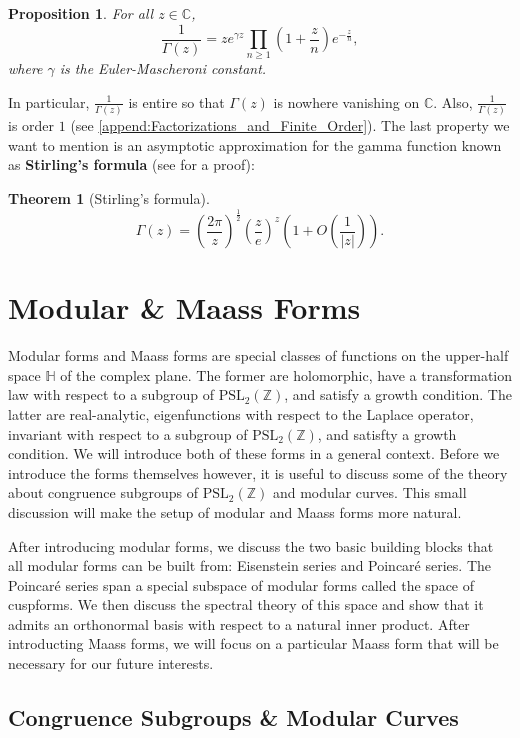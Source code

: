 \documentclass[12pt]{book}
\newtheorem{theorem}{Theorem}[section]
\newtheorem{proposition}{Proposition}[section]
\theoremstyle{definition}\newframedtheorem{method}{Method}
\newcommand{\PSL}{\mathrm{PSL}}
\newcommand{\Z}{\mathbb{Z}}
\newcommand{\C}{\mathbb{C}}
\renewcommand{\H}{\mathbb{H}}
\newcommand{\g}{\gamma}
\newcommand{\G}{\Gamma}
\newcommand{\<}{\langle}
\renewcommand{\>}{\rangle}
\begin{document}
    \begin{proposition}
      For all $z \in \C$,
      \[
        \frac{1}{\G(z)} = ze^{\g z}\prod_{n \ge 1}\left(1+\frac{z}{n}\right)e^{-\frac{z}{n}},
      \]
      where $\g$ is the Euler-Mascheroni constant.
    \end{proposition}

    In particular, $\frac{1}{\G(z)}$ is entire so that $\G(z)$ is nowhere vanishing on $\C$. Also, $\frac{1}{\G(z)}$ is order $1$ (see \cref{append:Factorizations_and_Finite_Order}). The last property we want to mention is an asymptotic approximation for the gamma function known as \textbf{Stirling's formula} (see \cite{remmert2013classical} for a proof):

    \begin{theorem}[Stirling's formula]
      \[
        \G(z) = \left(\frac{2\pi}{z}\right)^{\frac{1}{2}}\left(\frac{z}{e}\right)^{z}\left(1+O\left(\frac{1}{|z|}\right)\right).
      \]
    \end{theorem}
\chapter{Modular \& Maass Forms}
  Modular forms and Maass forms are special classes of functions on the upper-half space $\H$ of the complex plane. The former are holomorphic, have a transformation law with respect to a subgroup of $\PSL_{2}(\Z)$, and satisfy a growth condition. The latter are real-analytic, eigenfunctions with respect to the Laplace operator, invariant with respect to a subgroup of $\PSL_{2}(\Z)$, and satisfty a growth condition. We will introduce both of these forms in a general context. Before we introduce the forms themselves however, it is useful to discuss some of the theory about congruence subgroups of $\PSL_{2}(\Z)$ and modular curves. This small discussion will make the setup of modular and Maass forms more natural.

  After introducing modular forms, we discuss the two basic building blocks that all modular forms can be built from: Eisenstein series and Poincar\'e series. The Poincar\'e series span a special subspace of modular forms called the space of cuspforms. We then discuss the spectral theory of this space and show that it admits an orthonormal basis with respect to a natural inner product. After introducting Maass forms, we will focus on a particular Maass form that will be necessary for our future interests.
  \section{Congruence Subgroups \& Modular Curves}
\end{document}

